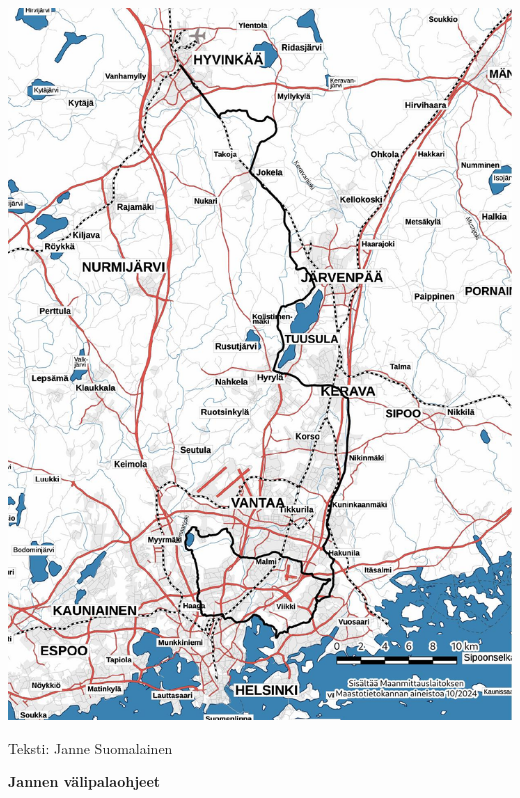 \begin{multicols}{2}
\vspace*{.25cm}

\begin{Figure}
\noindent\includegraphics[width=\linewidth,trim={5.75cm 0 .75cm 0},clip]{assets/mustaliljareitti.jpg}
\end{Figure}

\vspace*{.5cm}

{\raggedleft Teksti: Janne Suomalainen\par}
\end{multicols}


\clearpage
\vspace*{-1.55cm}
{\large\textbf{Jannen välipalaohjeet}\par}

